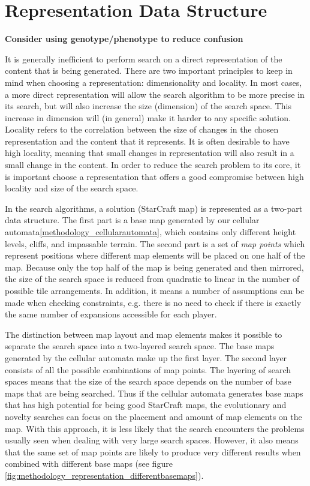 \section{Representation Data Structure}
\label{methodology_representation}
\textbf{Consider using genotype/phenotype to reduce confusion}

It is generally inefficient to perform search on a direct representation of the content that is being generated. There are two important principles to keep in mind when choosing a representation: dimensionality and locality. In most cases, a more direct representation will allow the search algorithm to be more precise in its search, but will also increase the size (dimension) of the search space. This increase in dimension will (in general) make it harder to any specific solution. Locality refers to the correlation between the size of changes in the chosen representation and the content that it represents. It is often desirable to have high locality, meaning that small changes in representation will also result in a small change in the content\cite{togelius2015searchbased}. In order to reduce the search problem to its core, it is important choose a representation that offers a good compromise between high locality and size of the search space. 

In the search algorithms, a solution (StarCraft map) is represented as a two-part data structure. The first part is a base map generated by our cellular automata\ref{methodology_cellularautomata}, which contains only different height levels, cliffs, and impassable terrain. The second part is a set of \textit{map points} which represent positions where different map elements will be placed on one half of the map. Because only the top half of the map is being generated and then mirrored, the size of the search space is reduced from quadratic to linear in the number of possible tile arrangements. In addition, it means a number of assumptions can be made when checking constraints, e.g. there is no need to check if there is exactly the same number of expansions accessible for each player.

The distinction between map layout and map elements makes it possible to separate the search space into a two-layered search space. The base maps generated by the cellular automata make up the first layer. The second layer consists of all the possible combinations of map points. The layering of search spaces means that the size of the search space depends on the number of base maps that are being searched. Thus if the cellular automata generates base maps that has high potential for being good StarCraft maps, the evolutionary and novelty searches can focus on the placement and amount of map elements on the map. With this approach, it is less likely that the search encounters the problems usually seen when dealing with very large search spaces. However, it also means that the same set of map points are likely to produce very different results when combined with different base maps (see figure \ref{fig:methodology_representation_differentbasemaps}).

